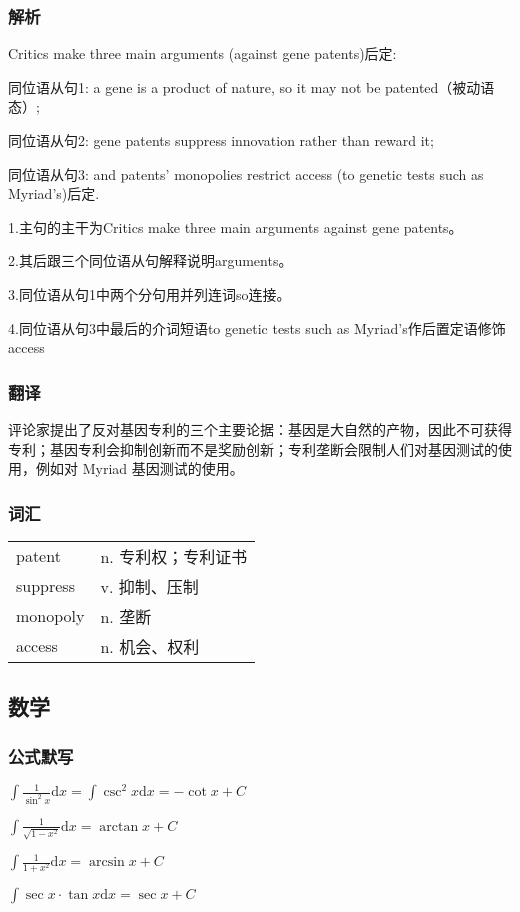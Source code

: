 \documentclass[UTF8]{ctexart}
\begin{document}
\subsubsection{解析}
Critics make three main arguments (against gene patents)后定:

同位语从句1: a gene is a product of nature, so it may not be patented（被动语态）;

同位语从句2: gene patents suppress innovation rather than reward it;

同位语从句3: and patents' monopolies restrict access (to genetic tests such as Myriad's)后定.

1.主句的主干为Critics make three main arguments against gene patents。

2.其后跟三个同位语从句解释说明arguments。

3.同位语从句1中两个分句用并列连词so连接。

4.同位语从句3中最后的介词短语to genetic tests such as Myriad’s作后置定语修饰access
\subsubsection{翻译}
评论家提出了反对基因专利的三个主要论据：基因是大自然的产物，因此不可获得专利；基因专利会抑制创新而不是奖励创新；专利垄断会限制人们对基因测试的使用，例如对 Myriad 基因测试的使用。
\subsubsection{词汇}
\begin{table}[h]
      \centering
      \begin{tabular}{p{}p{}}
            patent   & n.  专利权；专利证书 \\
            suppress & v.  抑制、压制    \\
            monopoly & n. 垄断        \\
            access   & n. 机会、权利
      \end{tabular}
\end{table}

\subsection{数学}
\subsubsection{公式默写}
\begin{multicols}{2}
      $\int\frac{1}{\sin^2x}\mathrm{d}x=\int\csc^2x\mathrm{d}x=-\cot x+C$

      $\int\frac{1}{\sqrt{1-x^2}}\mathrm{d}x=\arctan x+C$

      $\int\frac{1}{1+x^2}\mathrm{d}x=\arcsin x+C$

      $\int\sec x\cdot\tan x\mathrm{d}x=\sec x+C$
\end{multicols}
\end{document}
